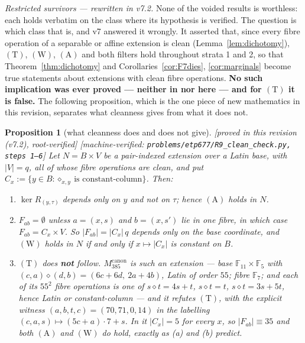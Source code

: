 \documentclass[11pt]{article}
\theoremstyle{plain}
\newtheorem{proposition}[theorem]{Proposition}
\theoremstyle{definition}
\theoremstyle{remark}
\numberwithin{equation}{section}
\newcommand{\F}{\mathbb{F}}
\newcommand{\statusbox}[1]{{\small\sloppy\textsf{[#1]}}}
\newcommand{\MV}[1]{\statusbox{machine-verified: \texttt{#1}}}
\newcommand{\PROVED}[1]{\statusbox{proved in #1, root-verified}}
\begin{document}
\emph{Restricted survivors --- rewritten in v7.2.} None of the voided results is
worthless: each holds verbatim on the class where its hypothesis is verified.
The question is which class that is, and v7 answered it wrongly. It asserted
that, since every fibre operation of a separable or affine extension is clean
(Lemma~\ref{lem:dichotomy}), $(\mathrm{T})$, $(\mathrm{W})$, $(\mathrm{A})$ and
both filters hold throughout strata 1 and 2, so that
Theorem~\ref{thm:dichotomy} and Corollaries~\ref{cor:F7dies},
\ref{cor:marginals} become true statements about extensions with clean fibre
operations. \textbf{No such implication was ever proved --- neither in
\cite{R9A} nor here --- and for $(\mathrm{T})$ it is false.} The following
proposition, which is the one piece of new mathematics in this revision,
separates what cleanness gives from what it does not.

\begin{proposition}[what cleanness does and does not give]\label{prop:cleansurv}
\PROVED{this revision (v7.2)}\;%
\MV{problems\slash etp677\slash R9\_clean\_check.py, steps 1--6}
Let $N = B\times V$ be a pair-indexed extension over a \emph{Latin} base, with
$|V| = q$, all of whose fibre operations are \emph{clean}, and put
$C_x := \{y\in B : \diamond_{x,y}\ \text{is constant-column}\}$. Then:
\begin{enumerate}
\item[(a)] $\ker R_{(y,\tau)}$ depends only on $y$ and not on $\tau$; hence
$(\mathrm{A})$ \emph{holds} in $N$.
\item[(b)] $F_{ab} = \emptyset$ unless $a = (x,s)$ and $b = (x,s')$ lie in one
fibre, in which case $F_{ab} = C_x\times V$. So $|F_{ab}| = |C_x|\,q$ depends
only on the base coordinate, and $(\mathrm{W})$ holds in $N$ if and only if
$x\mapsto|C_x|$ is constant on $B$.
\item[(c)] $(\mathrm{T})$ does \textbf{not} follow. $M_{385}^{\mathrm{canon}}$
is such an extension --- base $\F_{11}\times\F_5$ with
$(c,a)\diamond(d,b) = (6c+6d,\ 2a+4b)$, Latin of order $55$; fibre $\F_7$; and
each of its $55^2$ fibre operations is one of $s\diamond t = 4s+t$,
$s\diamond t = t$, $s\diamond t = 3s+5t$, hence Latin or constant-column --- and
it refutes $(\mathrm{T})$, with the explicit witness
$(a,b,t,c) = (70,71,0,14)$ in the labelling
$(c,a,s)\mapsto(5c+a)\cdot7+s$. In it $|C_x| = 5$ for every $x$, so
$|F_{ab}|\equiv35$ and both $(\mathrm{A})$ and $(\mathrm{W})$ do hold, exactly as
(a) and (b) predict.
\end{enumerate}
\end{proposition}
\end{document}
